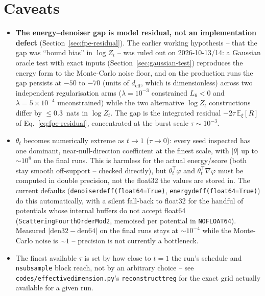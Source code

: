 \documentclass[11pt]{article}
\newcommand{\E}{\mathbb{E}}
\newcommand{\code}[1]{\texttt{#1}}
\renewcommand{\_}{\origunderscore\allowbreak}
\newcommand{\deff}{d_{\mathrm{eff}}}
\begin{document}
\section{Caveats}

\begin{itemize}
  \item \textbf{The energy--denoiser gap is model residual, not an
        implementation defect} (Section~\ref{sec:fpe-residual}). The
        earlier working hypothesis -- that the gap was ``bound bias'' in
        $\log Z_t$ -- was ruled out on 2026-10-13/14: a Gaussian oracle
        test with exact inputs (Section~\ref{sec:gaussian-test})
        reproduces the energy form to the Monte-Carlo noise floor, and on
        the production runs the gap persists at $-50$ to $-70$ (units of
        $\deff$, which is dimensionless) across
        two independent regularisation arms ($\lambda{=}10^{-3}$
        constrained $L_6{<}0$ and $\lambda{=}5\!\times\!10^{-4}$
        unconstrained) while the two alternative $\log Z_t$ constructions
        differ by $\leq 0.3$~nats in $\log Z_t$. The gap is the integrated residual
        $-2\tau\,\E_\xi[R]$ of Eq.~\ref{eq:fpe-residual}, concentrated at the
        burst scale $\tau\sim 10^{-3}$.
  \item $\theta_t$ becomes numerically extreme as $t\to1$ ($\tau\to0$):
        every seed inspected has one dominant, near-null-direction
        coefficient at the finest scale, with $|\theta|$ up to $\sim 10^8$
        on the final runs. This is harmless for the actual energy/score
        (both stay smooth off-support -- checked directly), but
        $\theta_t^\top\varphi$ and $\theta_t^\top\nabla\varphi$ must be
        computed in double precision, not the float32 the values are
        stored in. The current defaults
        (\code{denoiser\_d\_eff(float64=True)},
        \code{energy\_d\_eff(float64=True)}) do this automatically, with a
        silent fall-back to float32 for the handful of potentials whose
        internal buffers do not accept float64
        (\code{Scattering\_Fourth\_Order\_Mod2\_*}, memoised per potential
        in \code{\_NO\_FLOAT64}). Measured $|\mathrm{den32}-\mathrm{den64}|$
        on the final runs stays at $\sim 10^{-4}$ while the Monte-Carlo
        noise is $\sim 1$ -- precision is not currently a bottleneck.
  \item The finest available $\tau$ is set by how close to $t=1$ the run's
        schedule and \code{n\_subsample} block reach, not by an arbitrary
        choice -- see \code{codes/effective\_dimension.py}'s
        \code{reconstruct\_t\_reg} for the exact grid actually available
        for a given run.
\end{itemize}
\end{document}
